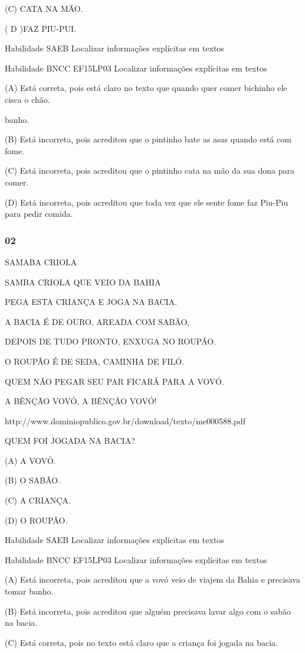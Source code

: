 (C) CATA NA MÃO.

( D )FAZ PIU-PUI.

Habilidade SAEB Localizar informações explícitas em textos

Habilidade BNCC EF15LP03 Localizar informações explícitas em textos

(A) Está correta, pois está claro no texto que quando quer comer
bichinho ele cisca o chão.

banho.

(B) Está incorreta, pois acreditou que o pintinho bate as asas quando
está com fome.

(C) Está incorreta, pois acreditou que o pintinho cata na mão da sua
dona para comer.

(D) Está incorreta, pois acreditou que toda vez que ele sente fome faz
Piu-Piu para pedir comida.

\subsubsection{02}\label{section-40}

SAMABA CRIOLA

SAMBA CRIOLA QUE VEIO DA BAHIA

PEGA ESTA CRIANÇA E JOGA NA BACIA.

A BACIA É DE OURO, AREADA COM SABÃO,

DEPOIS DE TUDO PRONTO, ENXUGA NO ROUPÃO.

O ROUPÃO É DE SEDA, CAMINHA DE FILÓ.

QUEM NÃO PEGAR SEU PAR FICARÁ PARA A VOVÓ.

A BÊNÇÃO VOVÓ, A BÊNÇÃO VOVÓ!

http://www.dominiopublico.gov.br/download/texto/me000588.pdf

QUEM FOI JOGADA NA BACIA?

(A) A VOVÒ.

(B) O SABÃO.

(C) A CRIANÇA.

(D) O ROUPÃO.

Habilidade SAEB Localizar informações explícitas em textos

Habilidade BNCC EF15LP03 Localizar informações explícitas em textos

(A) Está incorreta, pois acreditou que a vovó veio de viajem da Bahia e
precisava tomar banho.

(B) Está incorreta, pois acreditou que alguém precisava lavar algo com o
sabão na bacia.

(C) Está correta, pois no texto está claro que a criança foi jogada na
bacia.

